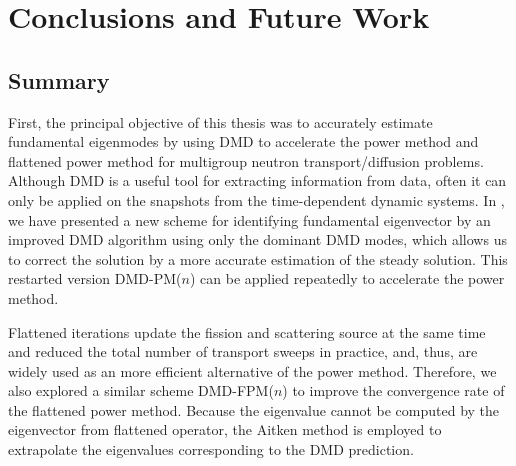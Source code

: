 
\cleardoublepage


\chapter{Conclusions and Future Work}
\label{chapter:conclusion}
\section{Summary}
First, the principal objective of this thesis was to accurately estimate fundamental eigenmodes by using DMD to accelerate the power method and flattened power method for multigroup neutron transport/diffusion problems.
Although DMD is a useful tool for extracting information from data, often it can only be applied on the snapshots from the time-dependent dynamic systems.
In , we have presented a new scheme for identifying fundamental eigenvector by an improved DMD algorithm using only the dominant DMD modes, which allows us to correct the solution by a more accurate estimation of the steady solution. 
This restarted version DMD-PM($n$) can be applied repeatedly to accelerate the power method.

Flattened iterations update the fission and scattering source at the same time and reduced the total number of transport sweeps in practice, and, thus, are widely used as an  more efficient alternative of the power method.
Therefore, we also explored a similar scheme DMD-FPM($n$) to improve the convergence rate of the flattened power method.
Because the eigenvalue cannot be computed by the eigenvector from flattened operator, the Aitken method is employed to extrapolate the eigenvalues corresponding to the DMD prediction.

